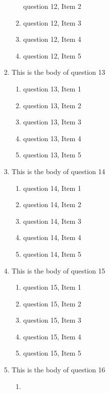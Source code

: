 \documentclass{article}
\begin{document}
\begin{enumerate}
\begin{enumerate}
    question 12, Item 2
    \item
    question 12, Item 3
    \item
    question 12, Item 4
    \item
    question 12, Item 5
    \end{enumerate}
\item
This is the body of question 13
    \begin{enumerate}
    \item
    question 13, Item 1
    \item
    question 13, Item 2
    \item
    question 13, Item 3
    \item
    question 13, Item 4
    \item
    question 13, Item 5
    \end{enumerate}
\item
This is the body of question 14
    \begin{enumerate}
    \item
    question 14, Item 1
    \item
    question 14, Item 2
    \item
    question 14, Item 3
    \item
    question 14, Item 4
    \item
    question 14, Item 5
    \end{enumerate}
\item
This is the body of question 15
    \begin{enumerate}
    \item
    question 15, Item 1
    \item
    question 15, Item 2
    \item
    question 15, Item 3
    \item
    question 15, Item 4
    \item
    question 15, Item 5
    \end{enumerate}
\item
This is the body of question 16
    \begin{enumerate}
    \item

\end{enumerate}
\end{enumerate}
\end{document}

